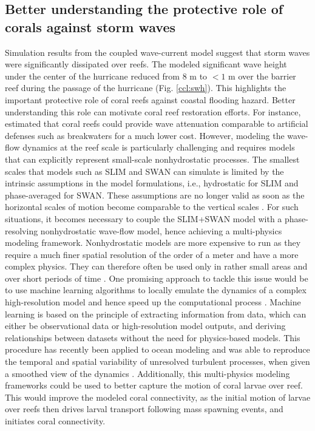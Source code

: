 \subsection*{Better understanding the protective role of corals against storm waves}
Simulation results from the coupled wave-current model suggest that storm waves were significantly dissipated over reefs. The modeled significant wave height under the center of the hurricane reduced from 8 m to $<1$ m over the barrier reef during the passage of the hurricane (Fig. \ref{ccl:swh}). This highlights the important protective role of coral reefs against coastal flooding hazard. Better understanding this role can motivate coral reef restoration efforts. For instance, \cite{ferrario2014effectiveness} estimated that coral reefs could provide wave attenuation comparable to artificial defenses such as breakwaters for a much lower cost. However, modeling the wave-flow dynamics at the reef scale is particularly challenging and requires models that can explicitly represent small-scale nonhydrostatic processes. The smallest scales that models such as SLIM and SWAN can simulate is limited by the intrinsic assumptions in the model formulations, i.e., hydrostatic for SLIM and phase-averaged for SWAN. These assumptions are no longer valid as soon as the horizontal scales of motion become comparable to the vertical scales \citep{marshall1997hydrostatic}. For such situations, it becomes necessary to couple the SLIM+SWAN model with a phase-resolving nonhydrostatic wave-flow model, hence achieving a multi-physics modeling framework. Nonhydrostatic models are more expensive to	 run as they require a much finer spatial resolution of the order of a meter and have a more complex physics. They can therefore often be used only in rather small areas and over short periods of time \citep{fringer2019future}. One promising approach to tackle this issue would be to use machine learning algorithms to locally emulate the dynamics of a complex high-resolution model and hence speed up the computational process \citep{kasim2021building}. Machine learning is based on the principle of extracting information from data, which can either be observational data or high-resolution model outputs, and deriving relationships between datasets without the need for physics-based models. This procedure has recently been applied to ocean modeling and was able to reproduce the temporal and spatial variability of unresolved turbulent processes, when given a smoothed view of the dynamics \citep{bolton2019applications}. Additionally, this multi-physics modeling frameworks could be used to better capture the motion of coral larvae over reef. This would improve the modeled coral connectivity, as the initial motion of larvae over reefs then drives larval transport following mass spawning events, and initiates coral connectivity. 

